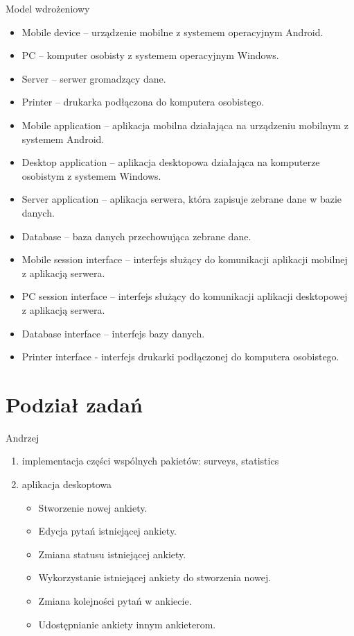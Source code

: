 \documentclass[a4paper,10pt]{beamer}
\begin{document}
		\begin{frame}{Model wdrożeniowy}
		\end{frame}
		
		\begin{frame}
			\begin{itemize}
			\item Mobile device – urządzenie mobilne z systemem operacyjnym Android.
			\item PC – komputer osobisty z systemem operacyjnym Windows.
			\item Server – serwer gromadzący dane.
			\item Printer – drukarka podłączona do komputera osobistego.
			\item Mobile application – aplikacja mobilna działająca na urządzeniu mobilnym z systemem Android.
			\item Desktop application – aplikacja desktopowa działająca na komputerze osobistym z systemem Windows.
			\item Server application – aplikacja serwera, która zapisuje zebrane dane w bazie danych.
			\item Database – baza danych przechowująca zebrane dane.
			\item Mobile session interface – interfejs służący do komunikacji aplikacji mobilnej z aplikacją serwera.
			\item PC session interface – interfejs służący do komunikacji aplikacji desktopowej z aplikacją serwera.
			\item Database interface – interfejs bazy danych.
			\item Printer interface  - interfejs drukarki podłączonej do komputera osobistego.
		\end{itemize}
		\end{frame}
		
		\section{Podział zadań}
		
		\begin{frame}{Andrzej}
			\begin{enumerate}
				\item	implementacja części wspólnych pakietów: surveys, statistics
				\item	aplikacja deskoptowa
				\begin{itemize}
					\item  Stworzenie nowej ankiety.
					\item	Edycja pytań istniejącej ankiety. 
					\item	Zmiana statusu istniejącej ankiety. 
					\item	Wykorzystanie istniejącej ankiety do stworzenia nowej. 
					\item	Zmiana kolejności pytań w ankiecie. 
					\item	Udostępnianie ankiety innym ankieterom.	
				\end{itemize}
			\end{enumerate}
		\end{frame}
		
\end{document}
